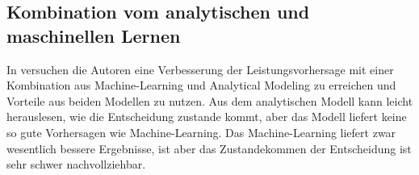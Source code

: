 \subsection{Kombination vom analytischen und maschinellen Lernen}

In \cite{Didona:2015:EPP:2668930.2688047} versuchen die Autoren eine Verbesserung der Leistungsvorhersage mit einer Kombination aus Machine-Learning und Analytical Modeling zu erreichen und Vorteile aus beiden Modellen zu nutzen. 
Aus dem analytischen Modell kann leicht herauslesen, wie die Entscheidung zustande kommt, aber das Modell liefert keine so gute Vorhersagen wie Machine-Learning.
Das Machine-Learning liefert zwar wesentlich bessere Ergebnisse, ist aber das Zustandekommen der Entscheidung ist sehr schwer nachvollziehbar. 

\bigskip

\textit{}